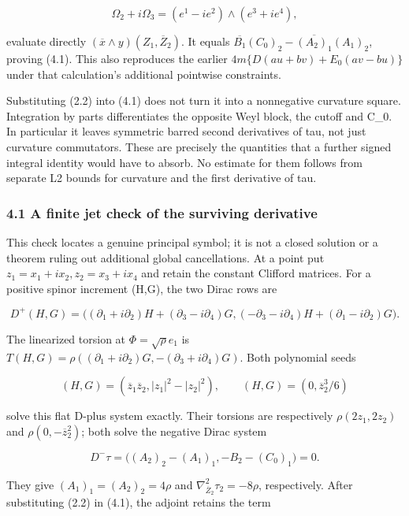 \documentclass[
  10pt,
]{article}
\begin{document}
\[
 \Omega_2+i\Omega_3=(e^1-ie^2)\wedge(e^3+ie^4),
\]

evaluate directly \((\overline x\wedge y)(Z_1,\overline Z_2)\). It
equals \(\overline{B_1}(C_0)_2-\overline{(A_2)_1}(A_1)_2\), proving
(4.1). This also reproduces the earlier \(4m\{D(au+bv)+E_0(av-bu)\}\)
under that calculation's additional pointwise constraints.

Substituting (2.2) into (4.1) does not turn it into a nonnegative
curvature square. Integration by parts differentiates the opposite Weyl
block, the cutoff and C\_0. In particular it leaves symmetric barred
second derivatives of tau, not just curvature commutators. These are
precisely the quantities that a further signed integral identity would
have to absorb. No estimate for them follows from separate L2 bounds for
curvature and the first derivative of tau.

\hypertarget{a-finite-jet-check-of-the-surviving-derivative}{%
\subsubsection{4.1 A finite jet check of the surviving
derivative}\label{a-finite-jet-check-of-the-surviving-derivative}}

This check locates a genuine principal symbol; it is not a closed
solution or a theorem ruling out additional global cancellations. At a
point put \(z_1=x_1+ix_2,z_2=x_3+ix_4\) and retain the constant Clifford
matrices. For a positive spinor increment (H,G), the two Dirac rows are

\[
 D^+(H,G)=\bigl((\partial_1+i\partial_2)H+
                   (\partial_3-i\partial_4)G,
       (-\partial_3-i\partial_4)H+(\partial_1-i\partial_2)G\bigr).
\]

The linearized torsion at \(\Phi=\sqrt\rho e_1\) is
\(T(H,G)=\rho((\partial_1+i\partial_2)G,  - (\partial_3+i\partial_4)G)\).
Both polynomial seeds

\[
 (H,G)=(\overline z_1\overline z_2,|z_1|^2-|z_2|^2),
 \qquad (H,G)=(0,\overline z_2^3/6)
\]

solve this flat D-plus system exactly. Their torsions are respectively
\(\rho(2z_1,2z_2)\) and \(\rho(0,-\overline z_2^2)\); both solve the
negative Dirac system

\[
 D^-\tau=\bigl((A_2)_2-(A_1)_1,-B_2-(C_0)_1\bigr)=0.
\]

They give \((A_1)_1=(A_2)_2=4\rho\) and
\(\nabla_{\overline Z_2}^2\tau_2=-8\rho\), respectively. After
substituting (2.2) in (4.1), the adjoint retains the term
\end{document}
